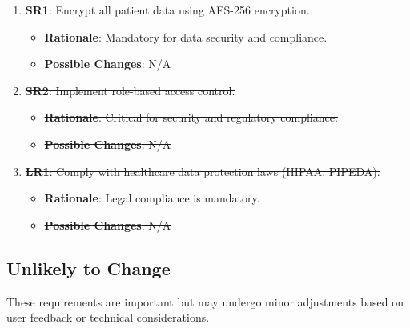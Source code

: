 \documentclass[12pt]{article}
\begin{document}
\begin{enumerate}
    \item \textbf{SR1}: Encrypt all patient data using AES-256 encryption.
    \begin{itemize}[label=-]
        \item \textbf{Rationale}: Mandatory for data security and compliance.
        \item \textbf{Possible Changes}: N/A
    \end{itemize}

    \item \sout{\textbf{SR2}: Implement role-based access control.}
    \begin{itemize}[label=-]
        \item \sout{\textbf{Rationale}: Critical for security and regulatory compliance.}
        \item \sout{\textbf{Possible Changes}: N/A}
    \end{itemize}

    \item \sout{\textbf{LR1}: Comply with healthcare data protection laws (HIPAA, PIPEDA).}
    \begin{itemize}[label=-]
        \item \sout{\textbf{Rationale}: Legal compliance is mandatory.}
        \item \sout{\textbf{Possible Changes}: N/A}
    \end{itemize}
\end{enumerate}

\subsection{Unlikely to Change}

These requirements are important but may undergo minor adjustments based on user feedback or technical considerations.
\end{document}
